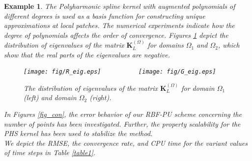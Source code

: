 \documentclass[9pt]{article}
\newtheorem{example}[theorem]{Example}
\numberwithin{equation}{section}
\begin{document}
\begin{example}
The Polyharmonic spline kernel with augmented polynomials of different degrees is used as a basis function for constructing unique approximations at local patches. The numerical experiments indicate how the degree of polynomials affects the order of convergence. Figures \ref{fig_eig} depict the distribution of eigenvalues of the matrix $\textbf{K}_{L}^{(\Omega)}$ for domains $\Omega_1$ and $\Omega_2$, which show that the real parts of the eigenvalues are negative.
\begin{figure}[!h]
\centering
\texttt{[image: fig/R\_eig.eps]}~~~~~~~~~~
\texttt{[image: fig/G\_eig.eps]}
\caption{The distribution of eigenvalues of the matrix $\textbf{K}_{L}^{(\Omega)}$ for domain $\Omega_1$ (left) and domain $\Omega_2$ (right).} \label{fig_eig}
\end{figure}
 In Figures \ref{fig_con}, the error behavior of our RBF-PU scheme concerning the number of points has been investigated. Further, the property scalability for the PHS kernel has been used to stabilize the method.\\
We depict the RMSE, the convergence rate, and CPU time for the variant values of time steps in Table \ref{table1}.
\end{example}

\end{document}
